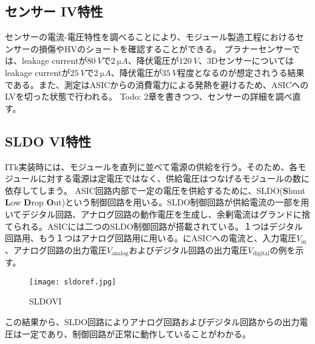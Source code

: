 \subsection{センサー IV特性}
\label{sec:sensoriv}
センサーの電流-電圧特性を調べることにより、モジュール製造工程におけるセンサーの損傷やHVのショートを確認することができる。
プラナーセンサーでは、leakage currentが$80\ \si{V}$で$2\ \si{\micro A}$、降伏電圧が$120\ \si{V}$、3Dセンサーについてはleakage currentが$25\ \si{V}$で$2\ \si{\micro A}$、降伏電圧が$35\ \si{V}$程度となるのが想定されうる結果である。また、測定はASICからの消費電力による発熱を避けるため、ASICへのLVを切った状態で行われる。
Todo: 2章を書きつつ、センサーの詳細を調べ直す。


\subsection{SLDO VI特性}
\label{sec:sldovi}
ITk実装時には、モジュールを直列に並べて電源の供給を行う。そのため、各モジュールに対する電源は定電圧ではなく、供給電圧はつなげるモジュールの数に依存してしまう。
ASIC回路内部で一定の電圧を供給するために、SLDO(\textbf{S}hunt \textbf{L}ow \textbf{D}rop \textbf{O}ut)という制御回路を用いる。SLDO制御回路が供給電流の一部を用いてデジタル回路、アナログ回路の動作電圧を生成し、余剰電流はグランドに捨てられる。ASICには二つのSLDO制御回路が搭載されている。１つはデジタル回路用、もう１つはアナログ回路用に用いる。にASICへの電流と、入力電圧$V_\mathrm{in}$、アナログ回路の出力電圧$V_\mathrm{analog}$およびデジタル回路の出力電圧$V_\mathrm{digital}$の例を示す。
\begin{figure}[tbp]
  \centering
  \texttt{[image: sldoref.jpg]}
  \caption[SLDOVI]{SLDOVI}
  \label{fig:sldoref}
\end{figure}
この結果から、SLDO回路によりアナログ回路およびデジタル回路からの出力電圧は一定であり、制御回路が正常に動作していることがわかる。


